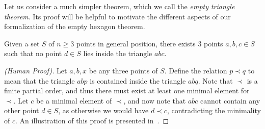 Let us consider a much simpler theorem, which we call the \emph{empty triangle theorem}. Its proof will be helpful to motivate the different aspects of our formalization of the empty hexagon theorem.

\begin{theorem}
  \label{thm:empty-triangle}
  Given a set $S$ of $n \geq 3$ points in general position, there exists $3$ points $a, b, c \in S$ such that no point $d \in S$ lies inside the triangle $abc$.
\end{theorem}

\begin{proof}[(Human Proof)]
    Let $a, b, x$ be any three points of $S$.
    Define the relation $p \prec q$ to mean that the triangle $abp$ is contained inside the triangle $abq$. Note that $\prec$ is a finite partial order, and thus there must exist at least one minimal element for $\prec$.
    Let $c$ be a minimal element of $\prec$, and now note that $abc$ cannot contain any other point $d \in  S$, as otherwise we would have $d \prec c$, contradicting the minimality of $c$. An illustration of this proof is presented in~.
\end{proof}

